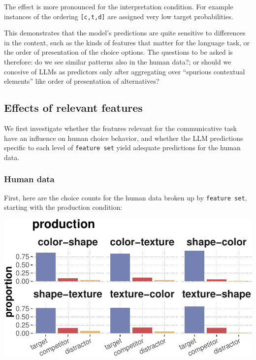\documentclass{article}
\begin{document}
The effect is more pronounced for the interpretation condition. For example instances of the ordering \texttt{[c,t,d]} are assigned very low target probabilities.



This demonstrates that the model's predictions are quite sensitive to differences in the context, such as the kinds of features that matter for the language task, or the order of presentation of the choice options.
The questions to be asked is therefore: do we see similar patterns also in the human data?; or should we conceive of LLMs as predictors only after aggregating over ``spurious contextual elements'' like order of presentation of alternatives?

\subsection{Effects of relevant features}

We first investigate whether the features relevant for the communicative
task have an influence on human choice behavior, and whether the LLM
predictions specific to each level of \texttt{feature\ set} yield
adequate predictions for the human data.

\hypertarget{human-data}{%
\subsubsection{Human data}\label{human-data}}

First, here are the choice counts for the human data broken up by
\texttt{feature\ set}, starting with the production condition:

\includegraphics{00-pics/human-data-counts-per-featureSet-1.pdf}
\end{document}
